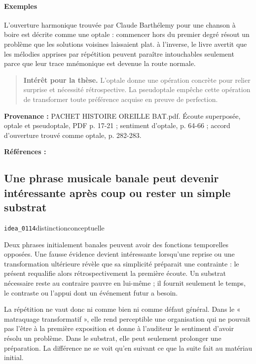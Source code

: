 \documentclass[10pt,a4paper]{article}
\begin{document}
\paragraph{Exemples}
L'ouverture harmonique trouvée par Claude Barthélemy pour une chanson à boire est décrite comme une optale : commencer hors du premier degré résout un problème que les solutions voisines laissaient plat. à l'inverse, le livre avertit que les mélodies apprises par répétition peuvent paraître intouchables seulement parce que leur trace mnémonique est devenue la route normale.

\begin{quote}
\textbf{Intérêt pour la thèse.} L'optale donne une opération concrète pour relier surprise et nécessité rétrospective. La pseudoptale empêche cette opération de transformer toute préférence acquise en preuve de perfection.
\end{quote}
{\footnotesize\color{metadata}\textbf{Provenance :} PACHET HISTOIRE OREILLE BAT.pdf. Écoute superposée, optale et pseudoptale, PDF p. 17-21 ; sentiment d'optale, p. 64-66 ; accord d'ouverture trouvé comme optale, p. 282-283.\par}
{\footnotesize\color{metadata}\textbf{Références :} \parencite{pachet2018oreille}\par}

\subsection{Une phrase musicale banale peut devenir intéressante après coup ou rester un simple substrat}
{\small\color{metadata} \texttt{idea\_0114}\quad\textbullet\quad distinction\quad\textbullet\quad conceptuelle\par}

Deux phrases initialement banales peuvent avoir des fonctions temporelles opposées. Une fausse évidence devient intéressante lorsqu'une reprise ou une transformation ultérieure révèle que sa simplicité préparait une contrainte : le présent requalifie alors rétrospectivement la première écoute. Un substrat nécessaire reste au contraire pauvre en lui-même ; il fournit seulement le temps, le contraste ou l'appui dont un événement futur a besoin.

La répétition ne vaut donc ni comme bien ni comme défaut général. Dans le « matraquage transformatif », elle rend perceptible une organisation qui ne pouvait pas l'être à la première exposition et donne à l'auditeur le sentiment d'avoir résolu un problème. Dans le substrat, elle peut seulement prolonger une préparation. La différence ne se voit qu'en suivant ce que la suite fait au matériau initial.
\end{document}
